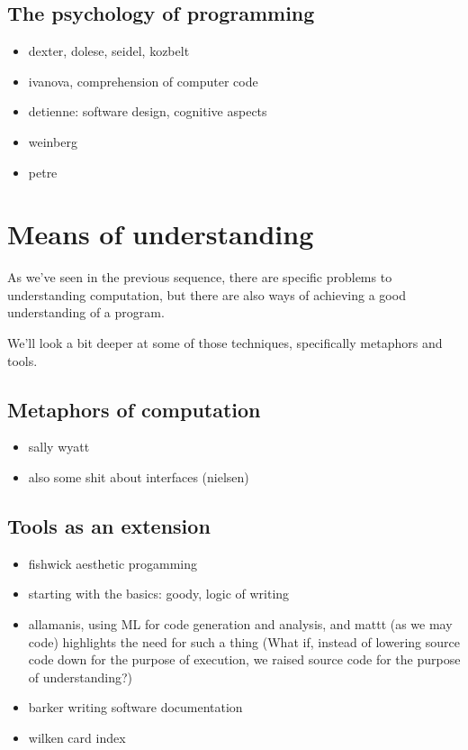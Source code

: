 \subsection{The psychology of programming}

\begin{itemize}
    \item dexter, dolese, seidel, kozbelt
    \item ivanova, comprehension of computer code
    \item detienne: software design, cognitive aspects
    \item weinberg
    \item petre
\end{itemize}

\section{Means of understanding}

As we've seen in the previous sequence, there are specific problems to understanding computation, but there are also ways of achieving a good understanding of a program.

We'll look a bit deeper at some of those techniques, specifically metaphors and tools.

\subsection{Metaphors of computation}

\begin{itemize}
    \item sally wyatt
    \item also some shit about interfaces (nielsen)
\end{itemize}

\subsection{Tools as an extension}

\begin{itemize}
    \item fishwick aesthetic progamming
    \item starting with the basics: goody, logic of writing
    \item allamanis, using ML for code generation and analysis, and mattt (as we may code) highlights the need for such a thing (What if, instead of lowering source code down for the purpose of execution, we raised source code for the purpose of understanding?)
    \item barker writing software documentation
    \item wilken card index
\end{itemize}

